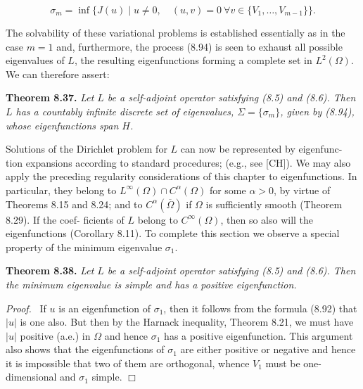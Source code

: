 \begin{equation}
\sigma_m=\inf \{J(u)\mid u\neq 0,\quad (u,v)=0\ \forall v\in \{V_1,\ldots,V_{m-1}\}\}.
\tag{8.94}
\end{equation}



The solvability of these variational problems is established essentially as in the case
$m=1$ and, furthermore, the process (8.94) is seen to exhaust all possible eigenvalues
of $L$, the resulting eigenfunctions forming a complete set in $L^2(\Omega)$. We can therefore
assert:

\medskip

\textbf{Theorem 8.37.} \textit{Let $L$ be a self-adjoint operator satisfying (8.5) and (8.6). Then $L$ has
a countably infinite discrete set of eigenvalues, $\Sigma=\{\sigma_m\}$, given by (8.94), whose
eigenfunctions span $H$.}

\medskip

Solutions of the Dirichlet problem for $L$ can now be represented by eigenfunc-
tion expansions according to standard procedures; (e.g., see [CH]). We may also
apply the preceding regularity considerations of this chapter to eigenfunctions. In
particular, they belong to $L^\infty(\Omega)\cap C^\alpha(\Omega)$ for some $\alpha>0$, by virtue of Theorems
8.15 and 8.24; and to $C^\alpha(\overline{\Omega})$ if $\Omega$ is sufficiently smooth (Theorem 8.29). If the coef-
ficients of $L$ belong to $C^\infty(\Omega)$, then so also will the eigenfunctions (Corollary 8.11).
To complete this section we observe a special property of the minimum
eigenvalue $\sigma_1$.

\medskip

\textbf{Theorem 8.38.} \textit{Let $L$ be a self-adjoint operator satisfying (8.5) and (8.6). Then the
minimum eigenvalue is simple and has a positive eigenfunction.}

\medskip

\textit{Proof.} \ If $u$ is an eigenfunction of $\sigma_1$, then it follows from the formula (8.92) that $|u|$
is one also. But then by the Harnack inequality, Theorem 8.21, we must have $|u|$
positive (a.e.) in $\Omega$ and hence $\sigma_1$ has a positive eigenfunction. This argument also
shows that the eigenfunctions of $\sigma_1$ are either positive or negative and hence it is
impossible that two of them are orthogonal, whence $V_1$ must be one-dimensional
and $\sigma_1$ simple. $\Box$

\bigskip

